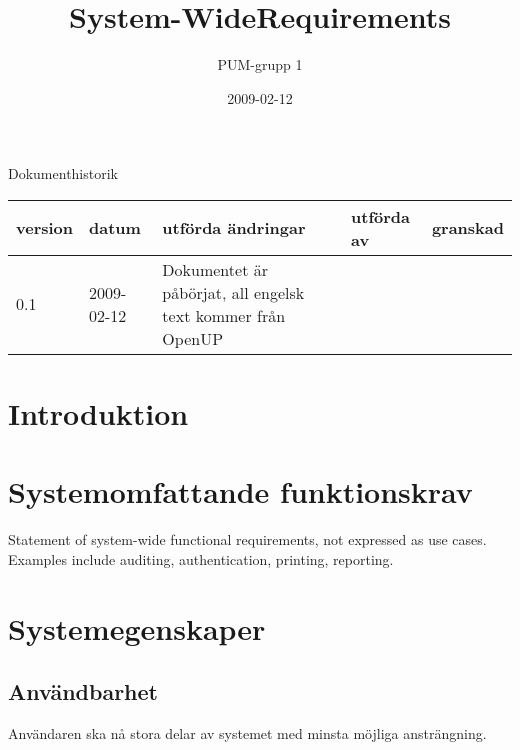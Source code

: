 

\ifpdf
\else
\fi

\title{System-WideRequirements}
\author{PUM-grupp 1}
\date{2009-02-12}



\maketitle\thispagestyle{empty}

\newpage

{\centering \Large{Dokumenthistorik\\}}

\vspace{10pt}
\begin{tabularx}{\textwidth}{ |l|l|X|l|l| }
  \hline
    \textbf{version} & \textbf{datum} & \textbf{utförda ändringar} & \textbf{utförda av} & \textbf{granskad} \\
	\hline 
  0.1 & 2009-02-12 &  Dokumentet är påbörjat, all engelsk text kommer från OpenUP & &   \\
  \hline
\end{tabularx}

\newpage

\setcounter{tocdepth}{2}
\tableofcontents
\newpage

\section{Introduktion}

\section{Systemomfattande funktionskrav}

Statement of system-wide functional requirements, not expressed as use cases. Examples include auditing, authentication, printing, reporting.

\section{Systemegenskaper}
\subsection{Användbarhet}
Användaren ska nå stora delar av systemet med minsta möjliga ansträngning.
